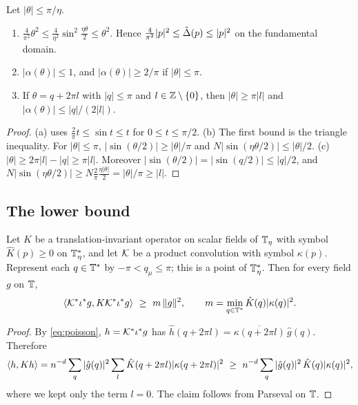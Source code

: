 \begin{lemma}\label{lem:symbols}
Let $|\theta|\le\pi/\eta$.
\begin{enumerate}[label=(\alph*)]
\item $\frac4{\pi^2}\theta^2\le\frac4{\eta^2}\sin^2\frac{\eta\theta}2\le\theta^2$. Hence $\frac4{\pi^2}|p|^2\le\hat{\Delta}(p)\le|p|^2$ on the fundamental domain.
\item $|\alpha(\theta)|\le1$, and $|\alpha(\theta)|\ge2/\pi$ if $|\theta|\le\pi$.
\item If $\theta=q+2\pi l$ with $|q|\le\pi$ and $l\in\mathbb Z\setminus\{0\}$, then $|\theta|\ge\pi|l|$ and $|\alpha(\theta)|\le|q|/(2|l|)$.
\end{enumerate}
\end{lemma}

\begin{proof}
(a) uses $\frac2\pi t\le\sin t\le t$ for $0\le t\le\pi/2$. (b) The first bound is the triangle inequality. For $|\theta|\le\pi$, $|\sin(\theta/2)|\ge|\theta|/\pi$ and $N|\sin(\eta\theta/2)|\le|\theta|/2$. (c) $|\theta|\ge2\pi|l|-|q|\ge\pi|l|$. Moreover $|\sin(\theta/2)|=|\sin(q/2)|\le|q|/2$, and $N|\sin(\eta\theta/2)|\ge N\frac2\pi\frac{\eta|\theta|}2=|\theta|/\pi\ge|l|$.
\end{proof}

\subsection{The lower bound}\label{ss:4.2}

\begin{lemma}\label{lem:fourier-lower}
Let $K$ be a translation-invariant operator on scalar fields of $\mathbb T_\eta$ with symbol $\hat K(p)\ge0$ on $\mathbb T_\eta^*$, and let $\mathcal K$ be a product convolution with symbol $\kappa(p)$. Represent each $q\in\mathbb T^*$ by $-\pi<q_\mu\le\pi$; this is a point of $\mathbb T_\eta^*$. Then for every field $g$ on $\mathbb T$,
\[
\ip{\cK^*\iota^*g}{K\cK^*\iota^*g}\ \ge\ m\,\|g\|^2,\qquad m=\min_{q\in\T^*}\hat K(q)|\kappa(q)|^2 .
\]
\end{lemma}

\begin{proof}
By \eqref{eq:poisson}, $h=\mathcal K^*\iota^*g$ has $\hat h(q+2\pi l)=\overline{\kappa(q+2\pi l)}\,\hat g(q)$. Therefore
\[
\ip h{Kh}=n^{-d}\sum_q|\hat g(q)|^2\sum_l\hat K(q+2\pi l)|\kappa(q+2\pi l)|^2\ \ge\ n^{-d}\sum_q|\hat g(q)|^2\,\hat K(q)|\kappa(q)|^2,
\]
where we kept only the term $l=0$. The claim follows from Parseval on $\mathbb T$.
\end{proof}

